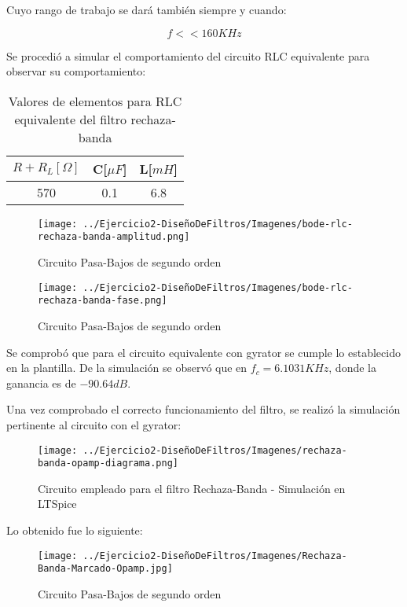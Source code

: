 Cuyo rango de trabajo se dará también siempre y cuando:

$$f << 160 KHz$$

Se procedió a simular el comportamiento del circuito RLC equivalente para observar su comportamiento:

\begin{table}[H]
    \centering
    \begin{tabular}{|c|c|c|}
    \hline
    \rowcolor[HTML]{C0C0C0} 
    $R+R_L[\Omega]$ & C[$\mu F$] & L[$mH$]  \\ \hline
    570      & 0.1  & 6.8 \\ \hline
    \end{tabular}
    \caption{Valores de elementos para RLC equivalente del filtro rechaza-banda}
    \end{table}

\begin{figure}[H]
    \centering
    \texttt{[image: ../Ejercicio2-DiseñoDeFiltros/Imagenes/bode-rlc-rechaza-banda-amplitud.png]}
    \caption{Circuito Pasa-Bajos de segundo orden}
\end{figure}

\begin{figure}[H]
    \centering
    \texttt{[image: ../Ejercicio2-DiseñoDeFiltros/Imagenes/bode-rlc-rechaza-banda-fase.png]}
    \caption{Circuito Pasa-Bajos de segundo orden}
\end{figure}

Se comprobó que para el circuito equivalente con gyrator se cumple lo establecido en la plantilla.
De la simulación se observó que en $f_c=6.1031 KHz$, donde la ganancia es de $-90.64 dB$.

Una vez comprobado el correcto funcionamiento del filtro, se realizó la simulación pertinente al circuito
con el gyrator:

\begin{figure}[H]
    \centering
    \texttt{[image: ../Ejercicio2-DiseñoDeFiltros/Imagenes/rechaza-banda-opamp-diagrama.png]}
    \caption{Circuito empleado para el filtro Rechaza-Banda - Simulación en LTSpice}
\end{figure}

Lo obtenido fue lo siguiente:

\begin{figure}[H]
    \centering
    \texttt{[image: ../Ejercicio2-DiseñoDeFiltros/Imagenes/Rechaza-Banda-Marcado-Opamp.jpg]}
    \caption{Circuito Pasa-Bajos de segundo orden}
\end{figure}

